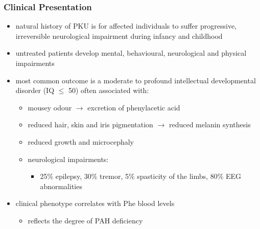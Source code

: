 \documentclass{scrartcl}
\begin{document}
\subsubsection{Clinical Presentation}
\label{sec:orgceda704}
\begin{itemize}
\item natural history of PKU is for affected individuals to suffer
progressive, irreversible neurological impairment during infancy and
childhood
\item untreated patients develop mental, behavioural, neurological and
physical impairments
\item most common outcome is a moderate to profound intellectual
developmental disorder (IQ \(\le\) 50) often associated with:
\begin{itemize}
\item mousey odour \(\to\) excretion of phenylacetic acid
\item reduced hair, skin and iris pigmentation \(\to\) reduced melanin synthesis
\item reduced growth and microcephaly
\item neurological impairments:
\begin{itemize}
\item 25\% epilepsy, 30\% tremor, 5\% spasticity of the limbs, 80\% EEG abnormalities
\end{itemize}
\end{itemize}
\item clinical phenotype correlates with Phe blood levels
\begin{itemize}
\item reflects the degree of PAH deficiency
\end{itemize}
\end{itemize}
\end{document}
